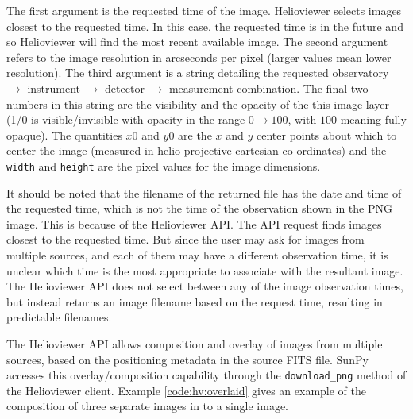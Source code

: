 The first argument is the requested time of the image.  Helioviewer
selects images closest to the requested time.  In this case, the
requested time is in the future and so Helioviewer will find the most
recent available image.  The second argument refers to the image
resolution in arcseconds per pixel (larger values mean lower
resolution).  The third argument is a string detailing the requested
observatory $\rightarrow$ instrument $\rightarrow$ detector
$\rightarrow$ measurement combination.  The final two numbers in this
string are the visibility and the opacity of the this image layer (1/0
is visible/invisible with opacity in the range $0\rightarrow100$, with
$100$ meaning fully opaque).  The quantities $x0$ and $y0$ are the $x$
and $y$ center points about which to center the image (measured in
helio-projective cartesian co-ordinates) and the \texttt{width} and
\texttt{height} are the pixel values for the image dimensions.

It should be noted that the filename of the returned file has the date
and time of the requested time, which is not the time of the
observation shown in the PNG image.  This is because of the
Helioviewer API.  The API request finds images closest to the
requested time. But since the user may ask for images from multiple
sources, and each of them may have a different observation time, it is
unclear which time is the most appropriate to associate with the
resultant image.  The Helioviewer API does not select between any of
the image observation times, but instead returns an image filename
based on the request time, resulting in predictable filenames.

The Helioviewer API allows composition and overlay of images from
multiple sources, based on the positioning metadata in the source FITS
file.  SunPy accesses this overlay/composition capability through the
\texttt{download_png} method of the Helioviewer client.  Example
\ref{code:hv:overlaid} gives an example of the composition of three
separate images in to a single image.

